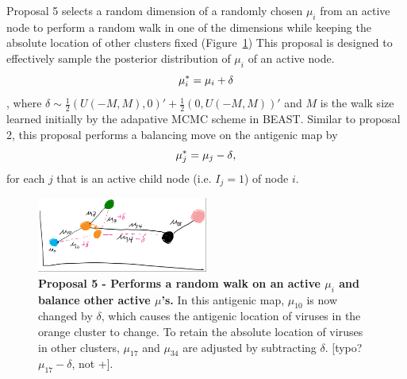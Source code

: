 \documentclass[11pt,oneside,letterpaper]{article}
\begin{document}
Proposal 5 selects a random dimension of a randomly chosen $\mu_i$ from an active node to perform a random walk in one of the dimensions while keeping the absolute location of other clusters fixed (Figure~\ref{walkAndBalance})
This proposal is designed to effectively sample the posterior distribution of $\mu_i$ of an active node. 
\begin{equation}
	\mu_i^{*} =  \mu_i + \delta \\
\end{equation},
where $\delta \sim \frac{1}{2} (U(-M, M), 0)' + \frac{1}{2} (0, U(-M, M))'$ and $M$ is the walk size learned initially by the adapative MCMC scheme in BEAST.
Similar to proposal 2, this proposal performs a balancing move on the antigenic map by
\begin{equation}
	\mu_j^{*} =  \mu_j - \delta\\     ,
\label{balance_mu}
\end{equation}
for each $j$ that is an active child node (i.e. $I_j = 1$) of node $i$.



\begin{figure}[h]
	\centering		
	\includegraphics[width=0.5\textwidth]{figures/walkAndBalance}
	\caption{\textbf{Proposal 5 - Performs a random walk on an active $\mu_i$ and balance other active $\mu$'s.} 
In this antigenic map, $\mu_{10}$ is now changed by $\delta$, which causes the antigenic location of viruses in the orange cluster to change. 
To retain the absolute location of viruses in other clusters,  $\mu_{17}$ and $\mu_{34}$ are adjusted by subtracting $\delta$. [typo?  $\mu_{17} - \delta$, not +].
	} 
	\label{walkAndBalance} 
\end{figure}
\end{document}
